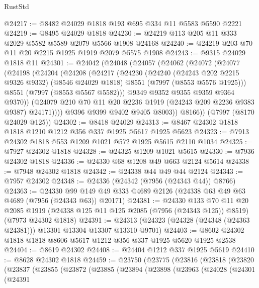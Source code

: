 \begin{lexlean}{RustStd}
\begin{coremodule}
@24217 := @8482 @24029 @1818 @193 @695 @334 @11 @5583 @5590 @2221
@24219 := @8495 @24029 @1818
@24230 := @24219 @113 @205 @11 @333 @2029 @5582 @5589 @2079 @5566 @1908 @24168
@24240 := @24219 @203 @70 @11 @20 @2215 @1925 @1919 @2079 @5575 @1908
@24243 := @9315 @24029 @1818 @11
@24301 := @24042
    (@24048
      (@24057
        (@24062
          (@24072
            (@24077
              (@24198
                (@24204
                  (@24208
                    (@24217
                      (@24230
                        (@24240
                          (@24243 @202 @2215 @9326 @9332)
                          (@8546 @24029 @1818)
                          @8551
                          (@7997 (@8553 @5576 @1925)))
                        @8551
                        (@7997 (@8553 @5567 @5582)))
                      @9349
                      @9352
                      @9355
                      @9359
                      @9364
                      @9370))
                  (@24079 @210 @70 @11 @20 @2236 @1919 (@24243 @209 @2236 @9383 @9387) @24171))))
            @9396
            @9399
            @9402
            @9405
            @8003))
        @8166))
    (@7997 (@8170 @24029 @125))
@24302 := @8418 @24029
@24313 := @8467 @24302 @1818 @1818 @1210 @1212 @356 @337 @1925 @5617 @1925 @5623
@24323 := @7913 @24302 @1818 @553 @1209 @1021 @572 @1925 @5615 @2110 @1034
@24325 := @7927 @24302 @1818
@24328 := @24325 @1209 @1021 @5615
@24330 := @7936 @24302 @1818
@24336 := @24330 @68 @1208 @49 @663 @2124 @5614
@24338 := @7948 @24302 @1818
@24342 := @24338 @44 @49 @44 @2124
@24343 := @7957 @24302
@24348 := @24336 (@24342 (@7956 (@24343 @44)) @8766)
@24363 := @24330
    @99
    @149
    @49
    @333
    @4689
    @2126
    (@24338 @63 @49 @63 @4689 (@7956 (@24343 @63)) @20171)
@24381 := @24330
    @133
    @70
    @11
    @20
    @2085
    @1919
    (@24338 @125 @11 @125 @2085 (@7956 (@24343 @125)) @8519)
    (@7973 @24302 @1818)
@24391 := @24313 (@24323 (@24328 (@24348 (@24363 @24381))) @13301 @13304 @13307 @13310 @9701)
@24403 := @8602 @24302 @1818 @1818 @8606 @5617 @1212 @356 @337 @1925 @5620 @1925 @2538
@24404 := @8619 @24302
@24408 := @24404 @1212 @337 @1925 @5619
@24410 := @8628 @24302 @1818
@24459 := @23750
    (@23775
      (@23816
        (@23818
          (@23820
            (@23837
              (@23855
                (@23872
                  (@23885
                    (@23894
                      (@23898
                        (@23963
                          (@24028
                            (@24301
                              (@24391

\end{coremodule}
\end{lexlean}
